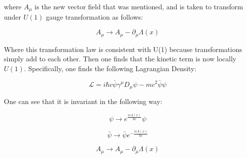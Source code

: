 \documentclass[a4]{article}
\begin{document}
    where $A_{\mu}$ is the new vector field that was mentioned, and is taken to transform under $U(1)$ gauge transformation as
    follows:

    \begin{equation}
        A_{\mu} \rightarrow A_{\mu} - \partial_{\mu} \Lambda (x)
    \end{equation}

    Where this transformation law is consistent with U(1) because transformations simply add to each other. Then one finds that
    the kinetic term is now locally $U(1)$. Specifically, one finds the following Lagrangian Density:

    \begin{equation}
        \mathcal{L} = i \hbar c \bar{\psi} \gamma^{\mu} D_{\mu} \psi - m c ^{2} \bar{\psi} \psi
    \end{equation}

    One can see that it is invariant in the following way:

    \begin{equation}
        \psi \rightarrow e^{\frac{i e \Lambda (x)}{\hbar c}} \psi
    \end{equation}

    \begin{equation}
        \bar{\psi} \rightarrow \bar{\psi} e^{- \frac{i e \Lambda (x)}{\hbar c}}
    \end{equation}

    \begin{equation}
        A_{\mu} \rightarrow A_{\mu} - \partial_{\mu} \Lambda (x)
    \end{equation}
\end{document}
